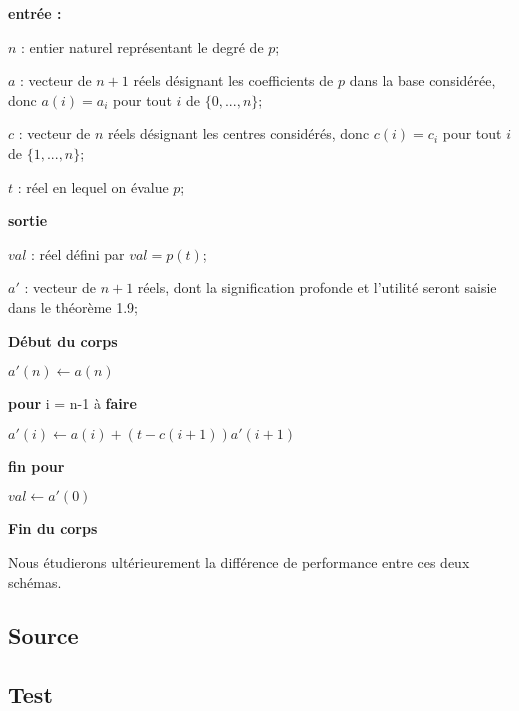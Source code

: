 \documentclass[a4paper,10pt]{report}
\begin{document}
\textbf{entrée :}

\begin{list}{}{}
\item $n$ : entier naturel représentant le degré de $p$;
\item $a$ : vecteur de $n+1$ réels désignant les coefficients de $p$ dans la base considérée, donc $a(i) = a_{i}$ pour tout $i$ de $\lbrace 0, ..., n\rbrace$;
\item $c$ : vecteur de $n$ réels désignant les centres considérés, donc $c(i)=c_{i}$ pour tout $i$ de $\lbrace 1, ..., n\rbrace$;
\item $t$ : réel en lequel on évalue $p$;
\end{list}

\textbf{sortie}
\begin{list}{}{}
\item $val$ : réel défini par $val = p(t)$;
\item $a'$ : vecteur de $n+1$ réels, dont la signification profonde et l'utilité seront saisie dans le théorème 1.9;
\end{list}

\textbf{Début du corps}
\begin{list}{}{}
\item $a'(n) \longleftarrow a(n)$
\item \textbf{pour} i = n-1 à \textbf{faire}
\item \begin{list}{}{}
\item $a'(i) \longleftarrow a(i) + (t-c(i+1))a'(i+1)$
\end{list}
\item \textbf{fin pour}
\item $val \longleftarrow a'(0)$
\end{list}

\textbf{Fin du corps}

Nous étudierons ultérieurement la différence de performance entre ces deux schémas. 

\newpage
\subsection*{Source}



\subsection*{Test}
\end{document}
